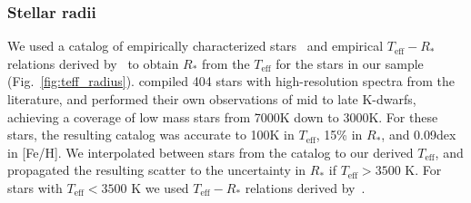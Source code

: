 \documentclass{aa}
\begin{document}
\subsubsection{Stellar radii}
\label{sec:sec:sec:r}
We used a catalog of empirically characterized stars~\citep{yee_specmatch_2017} and empirical $T_\mathrm{eff}-R_*$ relations derived by~\citet{mann_how_2015,mann_erratum_2016} to obtain $R_*$ from the $T_\mathrm{eff}$ for the stars in our sample (Fig.~\ref{fig:teff_radius}). \citet{yee_specmatch_2017} compiled 404 stars with high-resolution spectra from the literature, and performed their own observations of mid to late K-dwarfs, achieving a coverage of low mass stars from 7000\;K down to 3000\;K. For these stars, the resulting catalog was accurate to 100\;K in
$T_\mathrm{eff}$, 15\;\% in $R_*$, and 0.09\;dex in [Fe/H]. We interpolated between stars from the catalog to our derived $T_\mathrm{eff}$,  and propagated the resulting scatter to the uncertainty in $R_*$ if $T_\mathrm{eff}>3500$ K. For stars with \mbox{$T_\mathrm{eff}< 3500$} K we used $T_\mathrm{eff}-R_*$ relations derived by~\citet{mann_how_2015,mann_erratum_2016}. 
\end{document}
